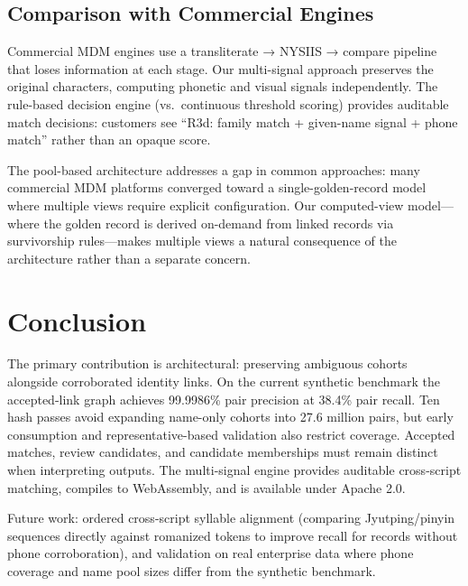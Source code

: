 \documentclass{article}
\begin{document}
\subsection{Comparison with Commercial Engines}

Commercial MDM engines use a transliterate → NYSIIS → compare pipeline that loses information at each stage. Our multi-signal approach preserves the original characters, computing phonetic and visual signals independently. The rule-based decision engine (vs.\ continuous threshold scoring) provides auditable match decisions: customers see ``R3d: family match + given-name signal + phone match'' rather than an opaque score.

The pool-based architecture addresses a gap in common approaches: many commercial MDM platforms converged toward a single-golden-record model where multiple views require explicit configuration. Our computed-view model—where the golden record is derived on-demand from linked records via survivorship rules—makes multiple views a natural consequence of the architecture rather than a separate concern.

\section{Conclusion}\label{sec:conclusion}

The primary contribution is architectural: preserving ambiguous cohorts alongside corroborated identity links. On the current synthetic benchmark the accepted-link graph achieves 99.9986\% pair precision at 38.4\% pair recall. Ten hash passes avoid expanding name-only cohorts into 27.6 million pairs, but early consumption and representative-based validation also restrict coverage. Accepted matches, review candidates, and candidate memberships must remain distinct when interpreting outputs. The multi-signal engine provides auditable cross-script matching, compiles to WebAssembly, and is available under Apache 2.0.

Future work: ordered cross-script syllable alignment (comparing Jyutping/pinyin sequences directly against romanized tokens to improve recall for records without phone corroboration), and validation on real enterprise data where phone coverage and name pool sizes differ from the synthetic benchmark.
\end{document}
